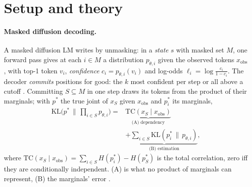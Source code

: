 %
%

\providecommand{\E}{\mathbb{E}}
\providecommand{\1}{\mathbf{1}}
\providecommand{\xobs}{x_{\mathrm{obs}}}
\ifdefined\proposition\else\newtheorem{proposition}{Proposition}\fi

\section{Setup and theory}
\label{sec:setup}

\paragraph{Masked diffusion decoding.}
A masked diffusion LM \citep{austin2021d3pm,sahoo2024mdlm,nie2025llada,ye2025dream} writes by
unmasking: in a \emph{state} $s$ with masked set $M$, one forward pass gives at each $i\in M$ a
distribution $p_{\theta,i}$ given the observed tokens $\xobs$, with top-1 token $v_i$,
\emph{confidence} $c_i=p_{\theta,i}(v_i)$ and log-odds $\ell_i=\log\frac{c_i}{1-c_i}$. The
decoder \emph{commits} positions for good: the $k$ most confident per step
\citep{chang2022maskgit} or all above a cutoff \citep{wu2025fastdllm}. Committing $S\subseteq M$ in one step draws its tokens from the product
of their marginals; with $p^*$ the true joint of $x_S$ given $\xobs$ and $p^*_i$ its marginals,
\begin{equation}
  \begin{split}
  \mathrm{KL}\bigl(p^* \,\|\, {\textstyle\prod_{i\in S}} p_{\theta,i}\bigr)
  = {} & \underbrace{\mathrm{TC}(x_S \mid \xobs)}_{\text{(A) dependency}} \\
  & + \underbrace{\sum_{i\in S}\mathrm{KL}(p^*_i \,\|\, p_{\theta,i})}_{\text{(B) estimation}} ,
  \end{split}
  \label{eq:decomp}
\end{equation}
where $\mathrm{TC}(x_S\mid\xobs)=\sum_{i\in S}H(p^*_i)-H(p^*_S)$ is the total correlation, zero
iff they are conditionally independent. (A) is what no product of marginals can
represent, (B) the marginals' error \citep[cf.][]{benhamu2025entropy}.

